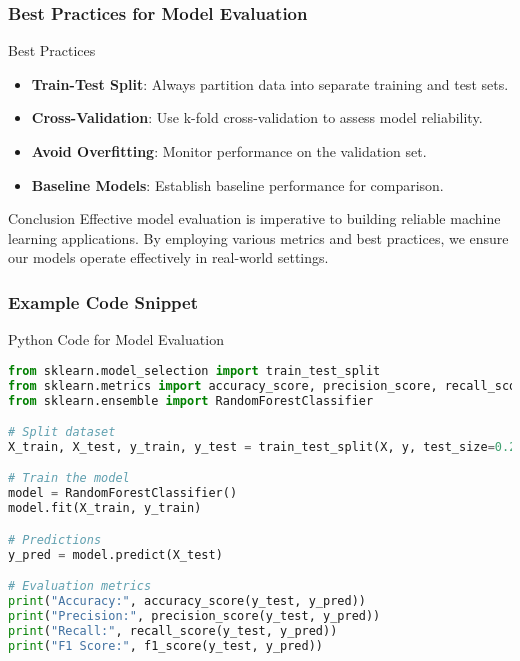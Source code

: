 \documentclass[aspectratio=169]{beamer}
\begin{document}
\begin{frame}[fragile]
    \frametitle{Best Practices for Model Evaluation}
    \begin{block}{Best Practices}
        \begin{itemize}
            \item \textbf{Train-Test Split}: Always partition data into separate training and test sets.
            \item \textbf{Cross-Validation}: Use k-fold cross-validation to assess model reliability.
            \item \textbf{Avoid Overfitting}: Monitor performance on the validation set.
            \item \textbf{Baseline Models}: Establish baseline performance for comparison.
        \end{itemize}
    \end{block}

    \begin{block}{Conclusion}
        Effective model evaluation is imperative to building reliable machine learning applications. By employing various metrics and best practices, we ensure our models operate effectively in real-world settings.
    \end{block}
\end{frame}

\begin{frame}[fragile]
    \frametitle{Example Code Snippet}
    \begin{block}{Python Code for Model Evaluation}
        \begin{lstlisting}[language=Python]
from sklearn.model_selection import train_test_split
from sklearn.metrics import accuracy_score, precision_score, recall_score, f1_score
from sklearn.ensemble import RandomForestClassifier

# Split dataset
X_train, X_test, y_train, y_test = train_test_split(X, y, test_size=0.2, random_state=42)

# Train the model
model = RandomForestClassifier()
model.fit(X_train, y_train)

# Predictions
y_pred = model.predict(X_test)

# Evaluation metrics
print("Accuracy:", accuracy_score(y_test, y_pred))
print("Precision:", precision_score(y_test, y_pred))
print("Recall:", recall_score(y_test, y_pred))
print("F1 Score:", f1_score(y_test, y_pred))
        \end{lstlisting}
    \end{block}
\end{frame}
\end{document}
